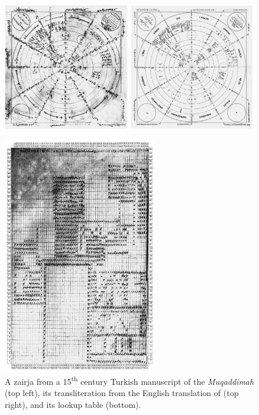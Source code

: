 \begin{figure}
    \centering


    \includegraphics[width=0.49\textwidth]{ch1/images/zairja.png}
    \includegraphics[width=0.49\textwidth]{ch1/images/zairjatl.png}
    
    \includegraphics[width=0.6\textwidth,angle=90]{ch1/images/zairjaback.png}

    \caption{A zairja from a 15\textsuperscript{th} century Turkish manuscript of the \textit{Muqaddimah} \citep{link2010variantology}
        (top left), its transliteration from the English translation
    of \cite{rosenthal1958muqaddimah} (top right), and its lookup table (bottom).}
    \label{fig:zairja}
\end{figure}


